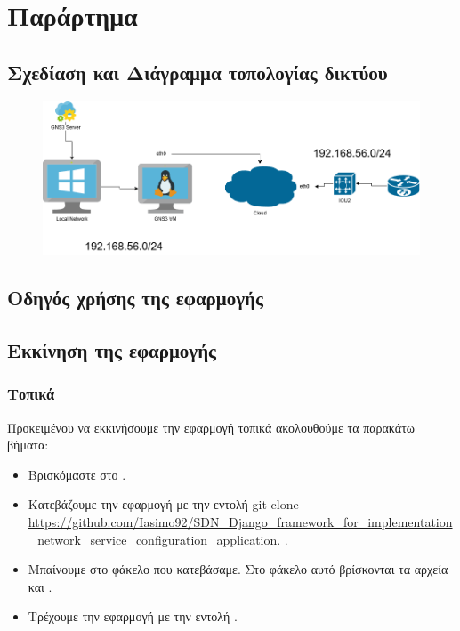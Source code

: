 
\chapter{Παράρτημα}

\section{Σχεδίαση και Διάγραμμα τοπολογίας δικτύου}

\FloatBarrier

\begin{figure}[h]
	\centering
	\includegraphics[width=1.1\textwidth]{graphics/network_topology_high_level.png}
	\caption{}
\end{figure}

\FloatBarrier

\section{Οδηγός χρήσης της εφαρμογής}

\section{Εκκίνηση της εφαρμογής}

\subsection{Τοπικά}

Προκειμένου να εκκινήσουμε την εφαρμογή τοπικά ακολουθούμε τα παρακάτω βήματα:

\begin{itemize}
    \item Βρισκόμαστε στο .
    \item Κατεβάζουμε την εφαρμογή με την εντολή  git clone \url{https://github.com/Iasimo92/SDN_Django_framework_for_implementation_network_service_configuration_application}. .
    \item Μπαίνουμε στο φάκελο που κατεβάσαμε. Στο φάκελο αυτό βρίσκονται τα αρχεία  και .
    \item Τρέχουμε την εφαρμογή με την εντολή .

\end{itemize}

